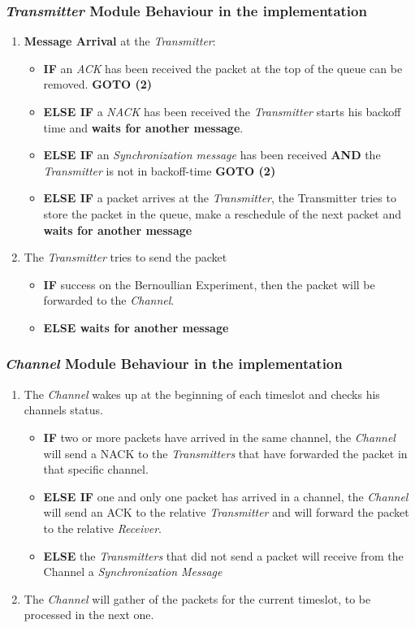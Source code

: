 \subsubsection{\textit{Transmitter} Module Behaviour in the implementation}
\begin{enumerate}
	\item \textbf{Message Arrival} at the \textit{Transmitter}:
	\begin{itemize}
		\item \textbf{IF} an \textit{ACK} has been received the packet at the top of the queue can be removed. \textbf{GOTO (2)}
		\item \textbf{ELSE IF} a \textit{NACK} has been received the \textit{Transmitter} starts his backoff time and \textbf{waits for another message}.
		\item \textbf{ELSE IF} an \textit{Synchronization message} has been received \textbf{AND} the \textit{Transmitter} is not in backoff-time \textbf{GOTO (2)}
		\item \textbf{ELSE IF} a packet arrives at the \textit{Transmitter}, the Transmitter tries to store the packet in the queue, make a reschedule of the next packet and \textbf{waits for another message}
	\end{itemize}
	\item The \textit{Transmitter} tries to send the packet
	\begin{itemize}
		\item \textbf{IF} success on the Bernoullian Experiment, then the packet will be forwarded to the \textit{Channel}.
		\item \textbf{ELSE waits for another message}
	\end{itemize}
\end{enumerate}
\subsubsection{\textit{Channel} Module Behaviour in the implementation}
\begin{enumerate}
	\item The \textit{Channel} wakes up at the beginning of each timeslot and checks his channels status.
	\begin{itemize}
		\item \textbf{IF} two or more packets have arrived in the same channel, the \textit{Channel} will send a NACK to the \textit{Transmitters} that have forwarded the packet in that specific channel.
		\item \textbf{ELSE IF} one and only one packet has arrived in a channel, the \textit{Channel} will send an ACK to the relative \textit{Transmitter} and will forward the packet to the relative \textit{Receiver}.
		\item \textbf{ELSE} the \textit{Transmitters} that did not send a packet will receive from the Channel a \textit{Synchronization Message}
	\end{itemize}
	\item The \textit{Channel} will gather of the packets for the current timeslot, to be processed in the next one.
\end{enumerate}
